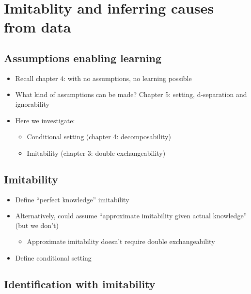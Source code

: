 

\chapter{Imitablity and inferring causes from data}\label{ch:6}


\section{Assumptions enabling learning}

\begin{itemize}
    \item Recall chapter 4: with no assumptions, no learning possible
    \item What kind of assumptions can be made? Chapter 5: setting, d-separation and ignorability
    \item Here we investigate:
    \begin{itemize}
        \item Conditional setting (chapter 4: decomposability)
        \item Imitability (chapter 3: double exchangeability)
    \end{itemize}
\end{itemize}

\section{Imitability}

\begin{itemize}
    \item Define ``perfect knowledge'' imitability
    \item Alternatively, could assume ``approximate imitability given actual knowledge'' (but we don't)
    \begin{itemize}
        \item Approximate imitability doesn't require double exchangeability
    \end{itemize}
    \item Define conditional setting
\end{itemize}

\section{Identification with imitability}


